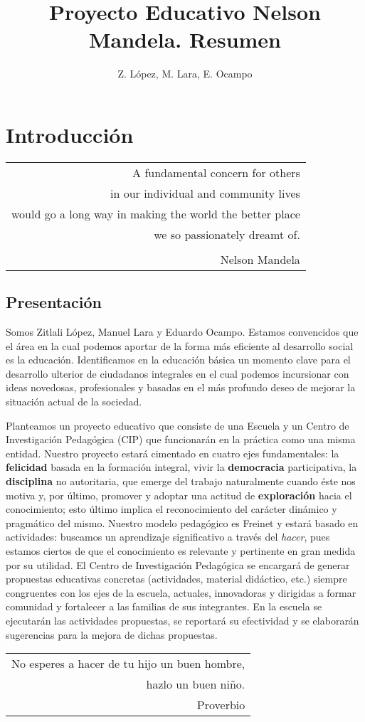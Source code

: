 \documentclass[10pt,letterpaper]{book}
\author{Z. López, M. Lara, E. Ocampo}
\title{Proyecto Educativo Nelson Mandela. Resumen}
\makeatletter
\newenvironment{myepigraph}
  {\par\hfill\itshape
   \begin{tabular}{@{}r@{\hspace{2em}}}} %
  {\end{tabular}\par\medskip}
\makeatother
\begin{document}
\maketitle
\tableofcontents

\chapter{Introducción}

\begin{myepigraph}A fundamental concern for others\\
in our individual and community lives\\
would go a long way in making the world the better place\\
we so passionately dreamt of.\\
\\
Nelson Mandela
\end{myepigraph}

\section{Presentación}

Somos Zitlali López, Manuel Lara y Eduardo Ocampo. Estamos convencidos que el área en la cual podemos aportar de la forma más eficiente al desarrollo social es la educación. Identificamos en la educación básica un momento clave para el desarrollo ulterior de ciudadanos integrales en el cual podemos incursionar con ideas novedosas, profesionales y basadas en el más profundo deseo de mejorar la situación actual de la sociedad.

Planteamos un proyecto educativo que consiste de una Escuela y un Centro de Investigación Pedagógica (CIP) que funcionarán en la práctica como una misma entidad. Nuestro proyecto estará cimentado en cuatro ejes fundamentales: la {\bf felicidad} basada en la formación integral, vivir la {\bf democracia} participativa, la {\bf disciplina} no autoritaria, que emerge del trabajo naturalmente cuando éste nos motiva y, por último, promover y adoptar una actitud de {\bf exploración} hacia el conocimiento; esto último implica el reconocimiento del carácter dinámico y pragmático del mismo. Nuestro modelo pedagógico es Freinet y estará basado en actividades: buscamos un aprendizaje significativo a través del \emph{hacer}, pues estamos ciertos de que el conocimiento es relevante y pertinente en gran medida por su utilidad. El Centro de Investigación Pedagógica se encargará de generar propuestas educativas concretas (actividades, material didáctico, etc.) siempre congruentes con los ejes de la escuela, actuales, innovadoras y dirigidas a formar comunidad y fortalecer a las familias de sus integrantes. En la escuela se ejecutarán las actividades propuestas, se reportará su efectividad y se elaborarán sugerencias para la mejora de dichas propuestas.
\vspace{1cm}
\begin{myepigraph}No esperes a hacer de tu hijo un buen hombre,\\
hazlo un buen niño.\\Proverbio
\end{myepigraph}
\end{document}
